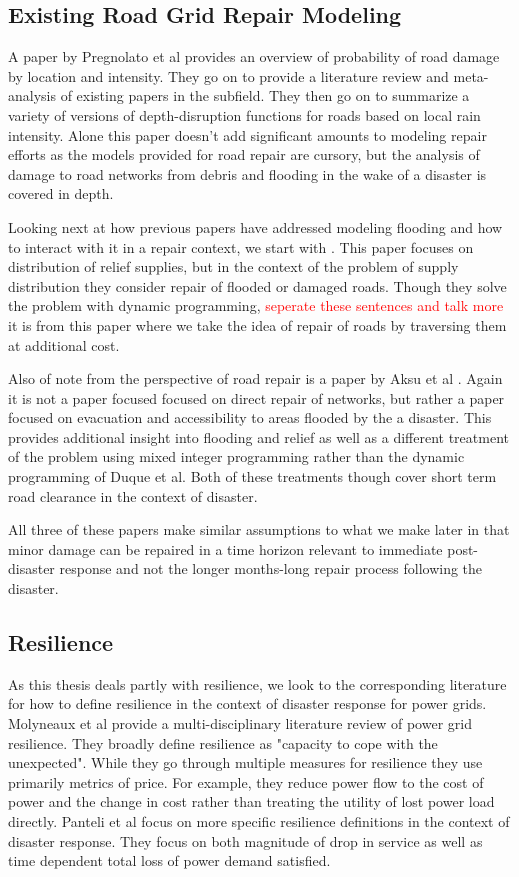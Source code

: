 \documentclass{article}
\begin{document}
	\subsection{Existing Road Grid Repair Modeling}
		A paper by Pregnolato et al\cite{PregnolatoEA2017} provides an overview of probability of road damage by location and intensity. They go on to provide a literature review and meta-analysis of existing papers in the subfield. They then go on to summarize a variety of versions of depth-disruption functions for roads based on local rain intensity. Alone this paper doesn't add significant amounts to modeling repair efforts as the models provided for road repair are cursory, but the analysis of damage to road networks from debris and flooding in the wake of a disaster is covered in depth.
		
		Looking next at how previous papers have addressed modeling flooding and how to interact with it in a repair context, we start with \cite{DuqueEA2016}. This paper focuses on distribution of relief supplies, but in the context of the problem of supply distribution they consider repair of flooded or damaged roads. Though they solve the problem with dynamic programming, \textcolor{red}{seperate these sentences and talk more} it is from this paper where we take the idea of repair of roads by traversing them at additional cost.
		
		Also of note from the perspective of road repair is a paper by Aksu et al \cite{AksuEA2014}. Again it is not a paper focused focused on direct repair of networks, but rather a paper focused on evacuation and accessibility to areas flooded by the a disaster. This provides additional insight into flooding and relief as well as a different treatment of the problem using mixed integer programming rather than the dynamic programming of Duque et al. Both of these treatments though cover short term road clearance in the context of disaster. 
		
		All three of these papers make similar assumptions to what we make later in that minor damage can be repaired in a time horizon relevant to immediate post-disaster response and not the longer months-long repair process following the disaster. 
	
	\subsection{Resilience}
		As this thesis deals partly with resilience, we look to the corresponding literature for how to define resilience in the context of disaster response for power grids. Molyneaux et al provide\cite{MolyneauxEA2016} a multi-disciplinary literature review of power grid resilience. They broadly define resilience as "capacity to cope with the unexpected". While they go through multiple measures for resilience they use primarily metrics of price. For example, they reduce power flow to the cost of power and the change in cost rather than treating the utility of lost power load directly. Panteli et al \cite{Panteli2017} focus on more specific resilience definitions in the context of disaster response. They focus on both magnitude of drop in service as well as time dependent total loss of power demand satisfied.
		
\end{document}

